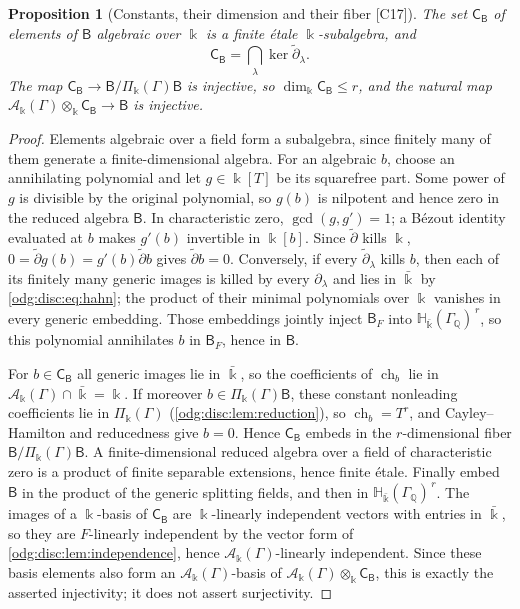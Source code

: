 \documentclass[11pt,oneside]{article}
\numberwithin{equation}{section}
\newtheorem{proposition}[proposition]{Proposition}
\theoremstyle{definition}
\theoremstyle{remark}
\newcommand{\Q}{\mathbb Q}
\newcommand{\src}[1]{\textup{\textsf{\small[#1]}}}
\newcommand{\crA}{\mathcal A_\Bbbk(\Gamma)}
\newcommand{\crP}{\Pi_\Bbbk(\Gamma)}
\newcommand{\Hbar}{\mathbb H_{\bar\Bbbk}(\Gamma_\Q)}
\begin{document}
\begin{proposition}[Constants, their dimension and their fiber \src{C17}]\label{odg:disc:prop:constants}
The set $\mathsf C_{\mathsf B}$ of elements of $\mathsf B$ algebraic over $\Bbbk$ is a
finite \'etale $\Bbbk$-subalgebra, and
\begin{equation}\label{odg:disc:eq:constantkernel}
 \mathsf C_{\mathsf B}=\bigcap_\lambda\ker\widetilde\partial_\lambda .
\end{equation}
The map $\mathsf C_{\mathsf B}\to\mathsf B/\crP\mathsf B$ is injective, so
$\dim_\Bbbk\mathsf C_{\mathsf B}\le r$, and the natural map
$\crA\otimes_\Bbbk\mathsf C_{\mathsf B}\to\mathsf B$ is injective.
\end{proposition}
\begin{proof}
Elements algebraic over a field form a subalgebra, since finitely many of them generate a
finite-dimensional algebra. For an algebraic $b$, choose an annihilating polynomial
and let $g\in\Bbbk[T]$ be its squarefree part. Some power of $g$ is divisible by the
original polynomial, so $g(b)$ is nilpotent and hence zero in the reduced algebra
$\mathsf B$. In characteristic zero, $\gcd(g,g')=1$; a B\'ezout identity evaluated at
$b$ makes $g'(b)$ invertible in $\Bbbk[b]$. Since $\widetilde\partial$ kills $\Bbbk$,
$0=\widetilde\partial g(b)=g'(b)\widetilde\partial b$ gives
$\widetilde\partial b=0$. Conversely, if every
$\widetilde\partial_\lambda$ kills $b$, then each of its finitely many generic images is
killed by every $\partial_\lambda$ and lies in $\bar\Bbbk$ by \eqref{odg:disc:eq:hahn};
the product of their minimal polynomials over $\Bbbk$ vanishes in every generic
embedding. Those embeddings jointly inject $\mathsf B_F$ into $\Hbar^{\,r}$, so this
polynomial annihilates $b$ in $\mathsf B_F$, hence in $\mathsf B$.

For $b\in\mathsf C_{\mathsf B}$ all generic images lie in $\bar\Bbbk$, so the coefficients
of $\operatorname{ch}_b$ lie in $\crA\cap\bar\Bbbk=\Bbbk$. If moreover $b\in\crP\mathsf B$,
these constant nonleading coefficients lie in $\crP$ (\cref{odg:disc:lem:reduction}), so
$\operatorname{ch}_b=T^r$, and Cayley--Hamilton and reducedness give $b=0$. Hence
$\mathsf C_{\mathsf B}$ embeds in the $r$-dimensional fiber $\mathsf B/\crP\mathsf B$. A
finite-dimensional reduced algebra over a field of characteristic zero is a product of
finite separable extensions, hence finite \'etale. Finally embed $\mathsf B$ in the product
of the generic splitting fields, and then in $\Hbar^{\,r}$. The images of a $\Bbbk$-basis of
$\mathsf C_{\mathsf B}$ are $\Bbbk$-linearly independent vectors with entries in
$\bar\Bbbk$, so they are $F$-linearly independent by the vector form of
\cref{odg:disc:lem:independence}, hence $\crA$-linearly independent. Since these basis
elements also form an $\crA$-basis of $\crA\otimes_\Bbbk\mathsf C_{\mathsf B}$, this is
exactly the asserted injectivity; it does not assert surjectivity.
\end{proof}
\end{document}

